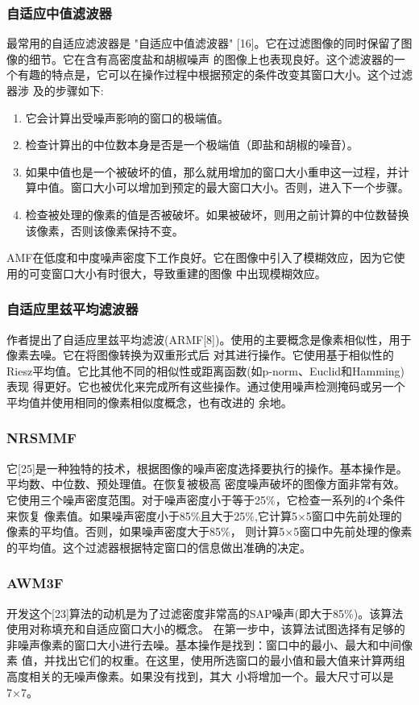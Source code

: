 \documentclass{article} %
\begin{document}
\subsubsection{自适应中值滤波器}
最常用的自适应滤波器是 "自适应中值滤波器" [16]。它在过滤图像的同时保留了图像的细节。它在含有高密度盐和胡椒噪声
的图像上也表现良好。这个滤波器的一个有趣的特点是，它可以在操作过程中根据预定的条件改变其窗口大小。这个过滤器涉
及的步骤如下:
\begin{enumerate}
    \item 它会计算出受噪声影响的窗口的极端值。
    \item 检查计算出的中位数本身是否是一个极端值（即盐和胡椒的噪音）。
    \item 如果中值也是一个被破坏的值，那么就用增加的窗口大小重申这一过程，并计算中值。窗口大小可以增加到预定的最大窗口大小。否则，进入下一个步骤。
    \item 检查被处理的像素的值是否被破坏。如果被破坏，则用之前计算的中位数替换该像素，否则该像素保持不变。
\end{enumerate}
AMF在低度和中度噪声密度下工作良好。它在图像中引入了模糊效应，因为它使用的可变窗口大小有时很大，导致重建的图像
中出现模糊效应。

\subsubsection{自适应里兹平均滤波器}
作者提出了自适应里兹平均滤波(ARMF[8])。使用的主要概念是像素相似性，用于像素去噪。它在将图像转换为双重形式后
对其进行操作。它使用基于相似性的Riesz平均值。它比其他不同的相似性或距离函数(如p-norm、Euclid和Hamming)表现
得更好。它也被优化来完成所有这些操作。通过使用噪声检测掩码或另一个平均值并使用相同的像素相似度概念，也有改进的
余地。

\subsubsection{NRSMMF}
它[25]是一种独特的技术，根据图像的噪声密度选择要执行的操作。基本操作是。平均数、中位数、预处理值。在恢复被极高
密度噪声破坏的图像方面非常有效。它使用三个噪声密度范围。对于噪声密度小于等于25\%，它检查一系列的4个条件来恢复
像素值。如果噪声密度小于85\%且大于25\%,它计算5×5窗口中先前处理的像素的平均值。否则，如果噪声密度大于85\%，
则计算5×5窗口中先前处理的像素的平均值。这个过滤器根据特定窗口的信息做出准确的决定。

\subsubsection{AWM3F}
开发这个[23]算法的动机是为了过滤密度非常高的SAP噪声(即大于85\%)。该算法使用对称填充和自适应窗口大小的概念。
在第一步中，该算法试图选择有足够的非噪声像素的窗口大小进行去噪。基本操作是找到：窗口中的最小、最大和中间像素
值，并找出它们的权重。在这里，使用所选窗口的最小值和最大值来计算两组高度相关的无噪声像素。如果没有找到，其大
小将增加一个。最大尺寸可以是7×7。
\end{document}
